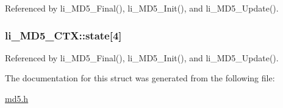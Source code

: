 Referenced by li\-\_\-\-M\-D5\-\_\-\-Final(), li\-\_\-\-M\-D5\-\_\-\-Init(), and li\-\_\-\-M\-D5\-\_\-\-Update().

\hypertarget{structli__MD5__CTX_a4ced6c0f23c09f7eed962dca25afe418}{
\subsubsection[{state}]{ li\-\_\-\-M\-D5\-\_\-\-C\-T\-X\-::state\mbox{[}4\mbox{]}}}\label{structli__MD5__CTX_a4ced6c0f23c09f7eed962dca25afe418}


Referenced by li\-\_\-\-M\-D5\-\_\-\-Final(), li\-\_\-\-M\-D5\-\_\-\-Init(), and li\-\_\-\-M\-D5\-\_\-\-Update().



The documentation for this struct was generated from the following file\-:\begin{DoxyCompactItemize}
\item 
\hyperlink{md5_8h}{md5.\-h}\end{DoxyCompactItemize}
